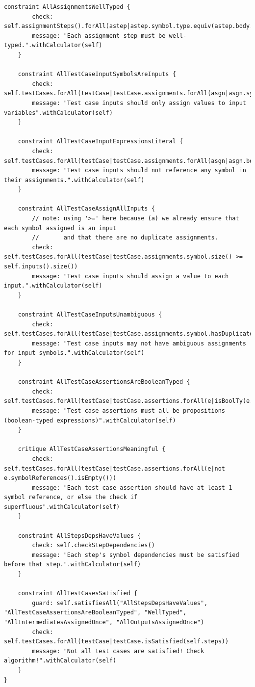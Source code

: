 \documentclass[11pt,fleqn]{article}
\begin{document}
\begin{lstlisting}[caption={Constraints and Critiques},label={lst:constraints-and-critiques}]
    constraint AllAssignmentsWellTyped {
        check: self.assignmentSteps().forAll(astep|astep.symbol.type.equiv(astep.body.type()))
        message: "Each assignment step must be well-typed.".withCalculator(self)
    }

    constraint AllTestCaseInputSymbolsAreInputs {
        check: self.testCases.forAll(testCase|testCase.assignments.forAll(asgn|asgn.symbol.declaration.kind==SymbolDeclarationKind#INPUT))
        message: "Test case inputs should only assign values to input variables".withCalculator(self)
    }

    constraint AllTestCaseInputExpressionsLiteral {
        check: self.testCases.forAll(testCase|testCase.assignments.forAll(asgn|asgn.body.symbolReferences().isEmpty()))
        message: "Test case inputs should not reference any symbol in their assignments.".withCalculator(self)
    }

    constraint AllTestCaseAssignAllInputs {
        // note: using '>=' here because (a) we already ensure that each symbol assigned is an input
        //       and that there are no duplicate assignments.
        check: self.testCases.forAll(testCase|testCase.assignments.symbol.size() >= self.inputs().size())
        message: "Test case inputs should assign a value to each input.".withCalculator(self)
    }

    constraint AllTestCaseInputsUnambiguous {
        check: self.testCases.forAll(testCase|testCase.assignments.symbol.hasDuplicates())
        message: "Test case inputs may not have ambiguous assignments for input symbols.".withCalculator(self)
    }

    constraint AllTestCaseAssertionsAreBooleanTyped {
        check: self.testCases.forAll(testCase|testCase.assertions.forAll(e|isBoolTy(e.type())))
        message: "Test case assertions must all be propositions (boolean-typed expressions)".withCalculator(self)
    }

    critique AllTestCaseAssertionsMeaningful {
        check: self.testCases.forAll(testCase|testCase.assertions.forAll(e|not e.symbolReferences().isEmpty()))
        message: "Each test case assertion should have at least 1 symbol reference, or else the check if superfluous".withCalculator(self)
    }

    constraint AllStepsDepsHaveValues {
        check: self.checkStepDependencies()
        message: "Each step's symbol dependencies must be satisfied before that step.".withCalculator(self)
    }

    constraint AllTestCasesSatisfied {
        guard: self.satisfiesAll("AllStepsDepsHaveValues", "AllTestCaseAssertionsAreBooleanTyped", "WellTyped", "AllIntermediatesAssignedOnce", "AllOutputsAssignedOnce")
        check: self.testCases.forAll(testCase|testCase.isSatisfied(self.steps))
        message: "Not all test cases are satisfied! Check algorithm!".withCalculator(self)
    }
}


\end{lstlisting}
\end{document}
